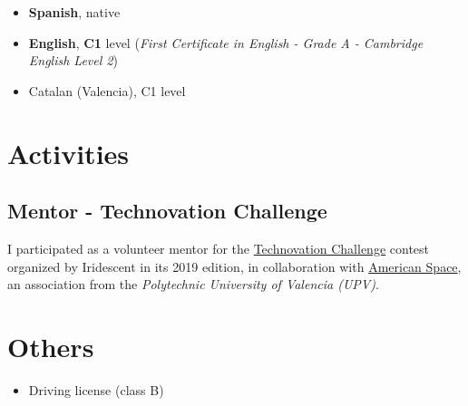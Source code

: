 \documentclass[letterpaper, 12pt, dvipsnames]{article}
\newcommand{\upvFull}{{\upvName} ({\upv})}
\newcommand{\upvName}{Polytechnic University of Valencia}
\newcommand{\upv}{UPV}
\newcommand{\fce}{\emph{First Certificate in English - Grade A - Cambridge English Level 2}}
\begin{document}
\begin{itemize}
    \item \textbf{Spanish}, native
    \item \textbf{English}, \textbf{C1} level (\fce)
    \item Catalan (Valencia), C1 level
\end{itemize}

\section*{Activities}

\subsection*{Mentor - Technovation Challenge}

I participated as a volunteer mentor for the \href{https://technovationchallenge.org/}{Technovation Challenge} contest organized by Iridescent in its 2019 edition, in collaboration with \href{https://americanspacev.upv.es/}{American Space}, an association from the \emph{\upvFull}.

\section*{Others}

\begin{itemize}
    \item Driving license (class B)
\end{itemize}
\end{document}
